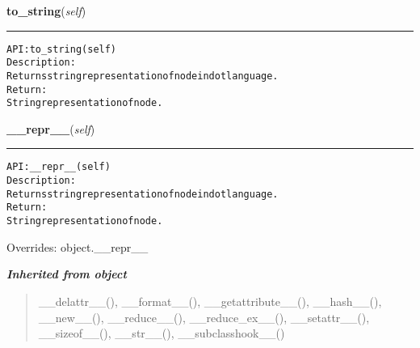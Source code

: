     \label{coinor:gimpy:graph:Node:to_string}

    \vspace{0.5ex}

\hspace{.8\funcindent}\begin{boxedminipage}{\funcwidth}

    \raggedright \textbf{to\_string}(\textit{self})

    \vspace{-1.5ex}

    \rule{\textwidth}{0.5\fboxrule}
\setlength{\parskip}{2ex}
\begin{alltt}

API: to\_string(self)
Description:
Returns string representation of node in dot language.
Return:
    String representation of node.
\end{alltt}

\setlength{\parskip}{1ex}
    \end{boxedminipage}

    \vspace{0.5ex}

\hspace{.8\funcindent}\begin{boxedminipage}{\funcwidth}

    \raggedright \textbf{\_\_repr\_\_}(\textit{self})

    \vspace{-1.5ex}

    \rule{\textwidth}{0.5\fboxrule}
\setlength{\parskip}{2ex}
\begin{alltt}

API: \_\_repr\_\_(self)
Description:
Returns string representation of node in dot language.
Return:
    String representation of node.
\end{alltt}

\setlength{\parskip}{1ex}
      Overrides: object.\_\_repr\_\_

    \end{boxedminipage}


\large{\textbf{\textit{Inherited from object}}}

\begin{quote}
\_\_delattr\_\_(), \_\_format\_\_(), \_\_getattribute\_\_(), \_\_hash\_\_(), \_\_new\_\_(), \_\_reduce\_\_(), \_\_reduce\_ex\_\_(), \_\_setattr\_\_(), \_\_sizeof\_\_(), \_\_str\_\_(), \_\_subclasshook\_\_()
\end{quote}

